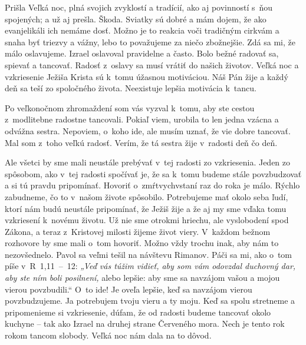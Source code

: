 


Prišla Veľká noc, plná svojich zvyklostí a tradícií, ako aj povinností s~ňou spojených; a už aj prešla. Škoda. Sviatky sú dobré a mám dojem, že ako evanjelikáli ich nemáme dosť. Možno je to reakcia voči tradičným cirkvám a snaha byť triezvy a vážny, lebo to považujeme za niečo zbožnejšie. Zdá sa mi, že málo oslavujeme. Izrael oslavoval pravidelne a často. Bolo bežné radovať sa, spievať a tancovať. Radosť z~oslavy sa musí vrátiť do našich životov. Veľká noc a vzkriesenie Ježiša Krista sú k~tomu úžasnou motiváciou. Náš Pán žije a každý deň sa teší zo spoločného života. Neexistuje lepšia motivácia k~tancu.

Po veľkonočnom zhromaždení som vás vyzval k~tomu, aby ste cestou z~modlitebne radostne tancovali. Pokiaľ viem, urobila to len jedna vzácna a odvážna sestra. Nepoviem, o~koho ide, ale musím uznať, že vie dobre tancovať. Mal som z~toho veľkú radosť. Verím, že tá sestra žije v~radosti deň čo deň.

Ale všetci by sme mali neustále prebývať v~tej radosti zo vzkriesenia. Jeden zo spôsobom, ako v~tej radosti spočívať je, že sa k~tomu budeme stále povzbudzovať a si tú pravdu pripomínať. Hovoriť o~zmŕtvychvstaní raz do roka je málo. Rýchlo zabudneme, čo to v~našom živote spôsobilo. Potrebujeme mať okolo seba ľudí, ktorí nám budú neustále pripomínať, že Ježiš žije a že aj my sme vďaka tomu vzkriesení k~novému životu. Už nie sme otrokmi hriechu, ale vyslobodení spod Zákona, a teraz z~Kristovej milosti žijeme život viery. V~každom bežnom rozhovore by sme mali o~tom hovoriť. Možno vždy trochu inak, aby nám to nezovšednelo.
Pavol sa veľmi tešil na návštevu Rimanov. Páči sa mi, ako o~tom píše v~R~1,11~--~12: {\it „Veď vás túžim vidieť, aby som vám odovzdal duchovný dar, aby ste ním boli posilnení,} {\bi alebo lepšie: aby sme sa navzájom vašou a mojou vierou povzbudili.“} O~to ide! Je oveľa lepšie, keď sa navzájom vierou povzbudzujeme. Ja potrebujem tvoju vieru a ty moju. Keď sa spolu stretneme a pripomenieme si vzkriesenie, dúfam, že od radosti budeme tancovať okolo kuchyne -- tak ako Izrael na druhej strane Červeného mora. Nech je tento rok rokom tancom slobody. Veľká noc nám dala na to dôvod.

